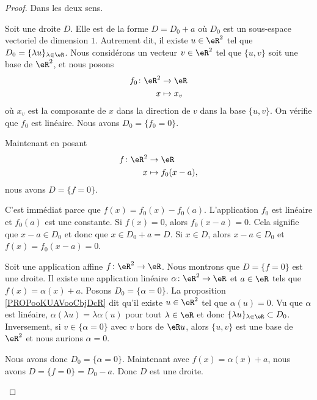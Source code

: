 \begin{proof}
	Dans les deux sens.
	\begin{subproof}
		\spitem[\( \Rightarrow\)]
		Soit une droite \( D\). Elle est de la forme \( D=D_0+a\) où \( D_0\) est un sous-espace vectoriel de dimension \( 1\). Autrement dit, il existe \( u\in \eR^2\) tel que \( D_0=\{ \lambda u \}_{\lambda\in \eR}\). Nous considérons un vecteur \( v\in \eR^2\) tel que \( \{ u,v \}\) soit une base de \( \eR^2\), et nous posons
		\begin{equation}
			\begin{aligned}
				f_0\colon \eR^2 & \to \eR     \\
				x               & \mapsto x_v
			\end{aligned}
		\end{equation}
		où \( x_v\) est la composante de \( x\) dans la direction de \( v\) dans la base \( \{ u,v \}\). On vérifie que \( f_0\) est linéaire. Nous avons \( D_0=\{ f_0=0 \}\).

		Maintenant en posant
		\begin{equation}
			\begin{aligned}
				f\colon \eR^2 & \to \eR           \\
				x             & \mapsto f_0(x-a),
			\end{aligned}
		\end{equation}
		nous avons \( D=\{ f=0 \}\).
		\begin{subproof}
			C'est immédiat parce que \( f(x)=f_0(x)-f_0(a)\). L'application \( f_0\) est linéaire et \( f_0(a)\) est une constante.
			\spitem[\( \{ f=0 \}\subset D\)]
			Si \( f(x)=0\), alors \( f_0(x-a)=0\). Cela signifie que \( x-a\in D_0\) et donc que \( x\in D_0+a=D\).
			\spitem[\( D\subset\{ f=0 \}\)]
			Si \( x\in D\), alors \( x-a\in D_0\) et \( f(x)=f_0(x-a)=0\).
		\end{subproof}
		\spitem[\( \Leftarrow\)]
		Soit une application affine \(f \colon \eR^2\to \eR  \). Nous montrons que \( D=\{ f=0 \}\) est une droite. Il existe une application linéaire \(\alpha \colon \eR^2\to \eR  \) et \( a\in \eR\) tels que \( f(x)=\alpha(x)+a\). Posons \( D_0=\{ \alpha=0 \}\). La proposition \ref{PROPooKUAVooCbjDcR} dit qu'il existe \( u\in \eR^2\) tel que \( \alpha(u)=0\). Vu que \( \alpha\) est linéaire, \( \alpha(\lambda u)=\lambda\alpha(u)\) pour tout \( \lambda\in \eR\) et donc \( \{ \lambda u \}_{\lambda \in \eR}\subset D_0\). Inversement, si \( v\in\{ \alpha=0 \}\) avec \( v\) hors de \( \eR u\), alors \( \{ u,v \}\) est une base de \( \eR^2\) et nous aurions \( \alpha=0\).

		Nous avons donc \( D_0=\{ \alpha=0 \}\). Maintenant avec \( f(x)=\alpha(x)+a\), nous avons \( D=\{ f=0 \}=D_0-a\). Donc \( D\) est une droite.
	\end{subproof}
\end{proof}

